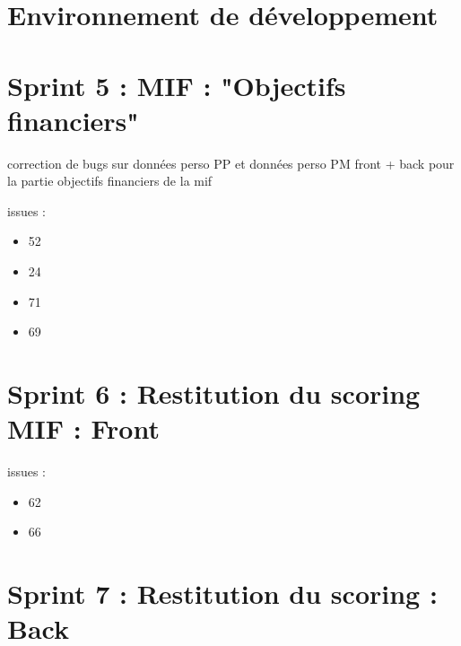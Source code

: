 
\section{Environnement de développement}
	
	
\section{Sprint 5 : MIF : "Objectifs financiers"}
	
	
	correction de bugs sur données perso PP et données perso PM
	front  + back pour la partie objectifs financiers de la mif
	
issues :
\begin{itemize}
	\item 52
	\item 24
	\item 71
	\item 69
\end{itemize}	

\section{Sprint 6 : Restitution du scoring MIF : Front}

issues :
\begin{itemize}
	\item 62
	\item 66
\end{itemize}
	
\section{Sprint 7 : Restitution du scoring : Back}
	

